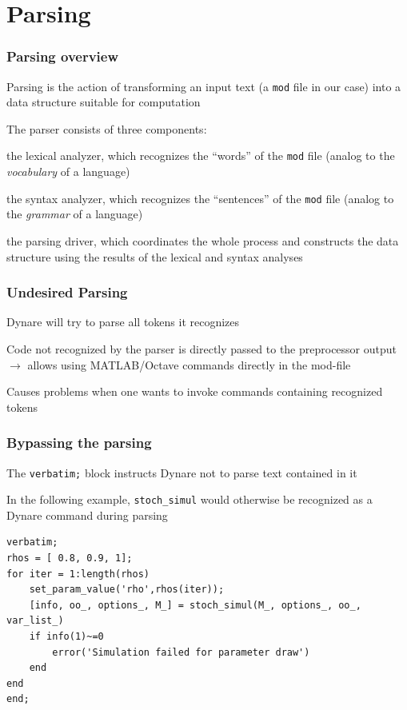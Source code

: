\documentclass[handout,usepdftitle=false,xcolor=dvipsnames,aspectratio=169]{beamer}
\begin{document}
\section{Parsing}

\begin{frame}
\frametitle{Parsing overview}
\begin{witemize}
\item Parsing is the action of transforming an input text (a \texttt{mod} file in our case) into a data structure suitable for computation
\item The parser consists of three components:
  \begin{wenumerate}
  \item the \alert{lexical analyzer}, which recognizes the ``words'' of the \texttt{mod} file (analog to the \textit{vocabulary} of a language)
  \item the \alert{syntax analyzer}, which recognizes the ``sentences'' of the \texttt{mod} file (analog to the \textit{grammar} of a language)
  \item the \alert{parsing driver}, which coordinates the whole process and constructs the data structure using the results of the lexical and syntax analyses
  \end{wenumerate}
\end{witemize}
\end{frame}

\begin{frame}[fragile]
\frametitle{Undesired Parsing}
\begin{witemize}
  \item Dynare will try to parse all tokens it recognizes
  \item Code not recognized by the parser is directly passed to the preprocessor output\\
  $\rightarrow$ allows using MATLAB/Octave commands directly in the mod-file
  \item Causes problems when one wants to invoke commands containing recognized tokens
 \end{witemize}
\end{frame}

\begin{frame}[fragile]
\frametitle{Bypassing the parsing}
\begin{witemize}
  \item The \texttt{verbatim;} block instructs Dynare not to parse text contained in it
  \item In the following example, \texttt{stoch\_simul} would otherwise be recognized as a Dynare command during parsing
\end{witemize}
\begin{verbatim}
verbatim;
rhos = [ 0.8, 0.9, 1];
for iter = 1:length(rhos)
    set_param_value('rho',rhos(iter));
    [info, oo_, options_, M_] = stoch_simul(M_, options_, oo_, var_list_)
    if info(1)~=0
        error('Simulation failed for parameter draw')
    end
end
end;
  \end{verbatim}
\end{frame}
\end{document}
